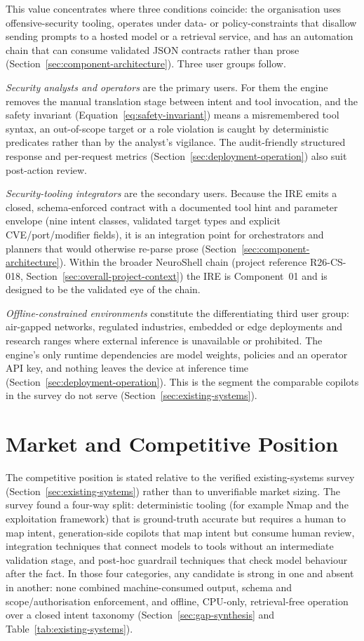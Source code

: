This value concentrates where three conditions coincide: the organisation uses
offensive-security tooling, operates under data- or policy-constraints that
disallow sending prompts to a hosted model or a retrieval service, and has an
automation chain that can consume validated JSON contracts rather than prose
(Section~\ref{sec:component-architecture}). Three user groups follow.

\emph{Security analysts and operators} are the primary users. For them the
engine removes the manual translation stage between intent and tool invocation,
and the safety invariant (Equation~\ref{eq:safety-invariant}) means a
misremembered tool syntax, an out-of-scope target or a role violation is caught
by deterministic predicates rather than by the analyst's vigilance. The
audit-friendly structured response and per-request metrics
(Section~\ref{sec:deployment-operation}) also suit post-action review.

\emph{Security-tooling integrators} are the secondary users. Because the IRE
emits a closed, schema-enforced contract with a documented tool hint and
parameter envelope (nine intent classes, validated target types and explicit
CVE/port/modifier fields), it is an integration point for orchestrators and
planners that would otherwise re-parse prose (Section~\ref{sec:component-architecture}).
Within the broader NeuroShell chain (project reference R26-CS-018,
Section~\ref{sec:overall-project-context}) the IRE is Component~01 and is
designed to be the validated eye of the chain.

\emph{Offline-constrained environments} constitute the differentiating third
user group: air-gapped networks, regulated industries, embedded or edge
deployments and research ranges where external inference is unavailable or
prohibited. The engine's only runtime dependencies are model weights, policies
and an operator API key, and nothing leaves the device at inference time
(Section~\ref{sec:deployment-operation}). This is the segment the comparable
copilots in the survey do not serve (Section~\ref{sec:existing-systems}).

\section{Market and Competitive Position}\label{sec:market-position}

The competitive position is stated relative to the verified
existing-systems survey (Section~\ref{sec:existing-systems}) rather than to
unverifiable market sizing. The survey found a four-way split: deterministic
tooling (for example Nmap and the exploitation framework) that is ground-truth
accurate but requires a human to map intent, generation-side copilots that map
intent but consume human review, integration techniques that connect models to
tools without an intermediate validation stage, and post-hoc guardrail
techniques that check model behaviour after the fact. In those four categories,
any candidate is strong in one and absent in another: none combined
machine-consumed output, schema and scope/authorisation enforcement, and
offline, CPU-only, retrieval-free operation over a closed intent taxonomy
(Section~\ref{sec:gap-synthesis} and Table~\ref{tab:existing-systems}).

